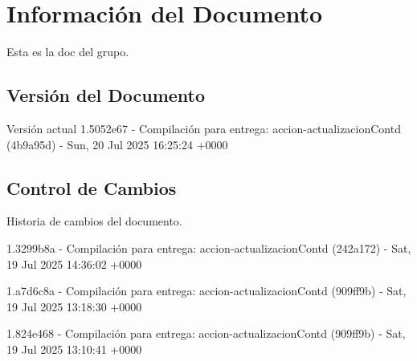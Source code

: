 \documentclass[
	a4paper, %
	12pt, %
]{include/CSSullivanBusinessReport}
\begin{document}
\newpage

\begin{twothirdswidth} %
	\tableofcontents %
\end{twothirdswidth}

\newpage


\newpage

\section{Información del
Documento}\label{sec:informaciuxf3n-del-documento}

Esta es la doc del grupo.

\subsection{Versión del Documento}\label{sec:versiuxf3n-del-documento}

\begin{quote}
\end{quote}

Versión actual 1.5052e67 - Compilación para entrega:
accion-actualizacionContd (4b9a95d) - Sun, 20 Jul 2025 16:25:24 +0000

\subsection{Control de Cambios}\label{sec:control-de-cambios}

Historia de cambios del documento.

1.3299b8a - Compilación para entrega: accion-actualizacionContd
(242a172) - Sat, 19 Jul 2025 14:36:02 +0000

1.a7d6c8a - Compilación para entrega: accion-actualizacionContd
(909ff9b) - Sat, 19 Jul 2025 13:18:30 +0000

1.824e468 - Compilación para entrega: accion-actualizacionContd
(909ff9b) - Sat, 19 Jul 2025 13:10:41 +0000
\end{document}
